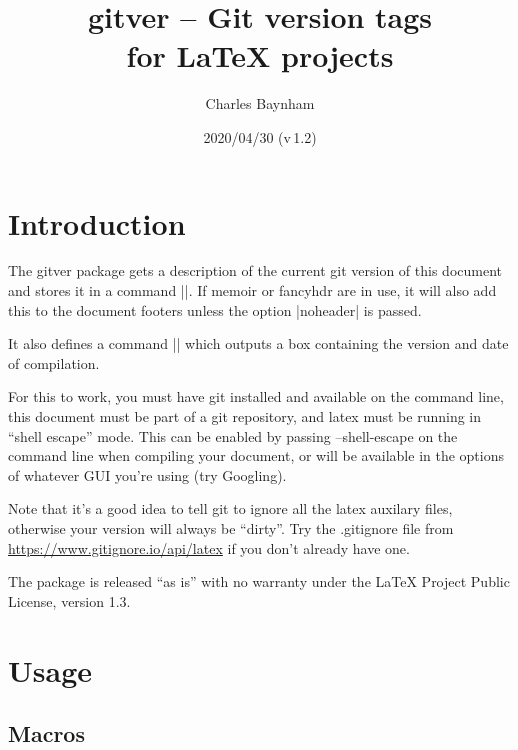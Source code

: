 \documentclass[a4paper]{ltxdoc}
\begin{document}
\title{\textsf{gitver} -- Git version tags \\ 
for \LaTeX{} projects}
\author{Charles Baynham}
\date{2020/04/30 (v\,1.2)}

\maketitle

\section{Introduction}

The \textsf{gitver} package gets a description of the current git version of this
document and stores it in a command |\gitVer|. If memoir or fancyhdr are in use, it
will also add this to the document footers unless the option |noheader| is
passed.

It also defines a command |\versionBox| which outputs a box containing the
version and date of compilation. 

For this to work, you must have git installed and available on the command
line, this document must be part of a git repository, and latex must be
running in ``shell escape'' mode. This can be enabled by passing \textsf{--shell-escape}
on the command line when compiling your document, or will be available in the
options of whatever GUI you're using (try Googling).

Note that it's a good idea to tell git to ignore all the latex auxilary files,
otherwise your version will always be ``dirty''. Try the \textsf{.gitignore} file from
\url{https://www.gitignore.io/api/latex} if you don't already have
one.

The package is released ``as is'' with no warranty under the LaTeX Project Public
License, version 1.3.

\section{Usage}

\subsection{Macros} %
\label{sub:macros}
\end{document}
